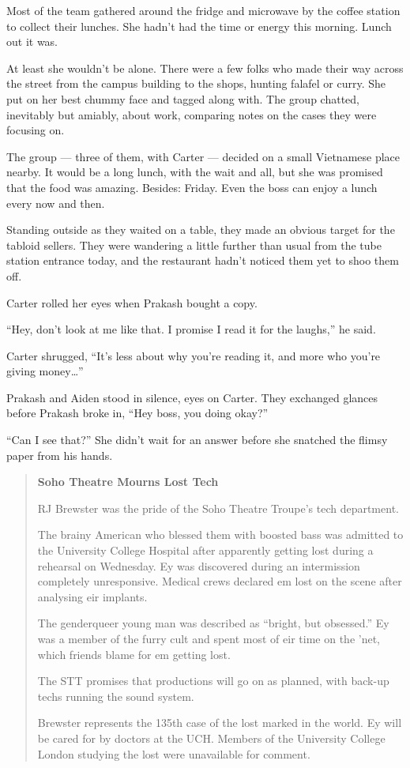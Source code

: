 Most of the team gathered around the fridge and microwave by the coffee station to collect their lunches. She hadn't had the time or energy this morning. Lunch out it was.

At least she wouldn't be alone. There were a few folks who made their way across the street from the campus building to the shops, hunting falafel or curry. She put on her best chummy face and tagged along with. The group chatted, inevitably but amiably, about work, comparing notes on the cases they were focusing on.

The group — three of them, with Carter — decided on a small Vietnamese place nearby. It would be a long lunch, with the wait and all, but she was promised that the food was amazing. Besides: Friday. Even the boss can enjoy a lunch every now and then.

Standing outside as they waited on a table, they made an obvious target for the tabloid sellers. They were wandering a little further than usual from the tube station entrance today, and the restaurant hadn't noticed them yet to shoo them off.

Carter rolled her eyes when Prakash bought a copy.

``Hey, don't look at me like that. I promise I read it for the laughs,'' he said.

Carter shrugged, ``It's less about why you're reading it, and more who you're giving money\ldots{}''

Prakash and Aiden stood in silence, eyes on Carter. They exchanged glances before Prakash broke in, ``Hey boss, you doing okay?''

``Can I see that?'' She didn't wait for an answer before she snatched the flimsy paper from his hands.

\vspace{1ex}
\begin{quote}
\textbf{Soho Theatre Mourns Lost Tech}

RJ Brewster was the pride of the Soho Theatre Troupe's tech department.

The brainy American who blessed them with boosted bass was admitted to the University College Hospital after apparently getting lost during a rehearsal on Wednesday. Ey was discovered during an intermission completely unresponsive. Medical crews declared em lost on the scene after analysing eir implants.

The genderqueer young man was described as ``bright, but obsessed.'' Ey was a member of the furry cult and spent most of eir time on the 'net, which friends blame for em getting lost.

The STT promises that productions will go on as planned, with back-up techs running the sound system.

Brewster represents the 135th case of the lost marked in the world. Ey will be cared for by doctors at the UCH. Members of the University College London studying the lost were unavailable for comment.
\end{quote}
\vspace{2ex}

